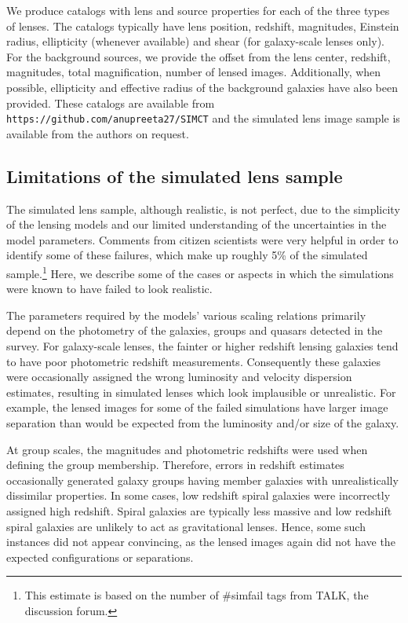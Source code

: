 \documentclass[useAMS,usenatbib,a4paper]{mn2e}
\begin{document}
We produce catalogs with lens and source properties for each of the
three types of lenses.  The catalogs typically have lens position,
redshift, magnitudes, Einstein radius, ellipticity (whenever available)
and shear (for galaxy-scale lenses only). For the background sources, we
provide the offset from the lens center, redshift, magnitudes, total
magnification, number of lensed images. Additionally, when possible,
ellipticity and effective radius of the background galaxies have also
been provided. These catalogs are available from
\texttt{https://github.com/anupreeta27/SIMCT} and the
simulated lens image sample is available from the authors on request.


\subsection{Limitations of the simulated lens sample}

The simulated lens sample, although realistic, is not perfect, due to
the simplicity of the lensing models and our limited understanding of
the uncertainties in the model parameters. Comments from citizen
scientists were very helpful in order to identify some of these failures, which
make up roughly 5\% of the simulated sample.\footnote{This estimate is
based on the number of \#simfail tags from TALK, the discussion forum.}
Here, we describe some of the cases or aspects in which the simulations
were known to have failed to look realistic.

The parameters required by the models' various scaling relations
primarily depend on the photometry of the galaxies, groups and quasars
detected in the survey. For galaxy-scale lenses, the fainter or higher redshift
lensing galaxies tend to have poor photometric redshift
measurements. Consequently these galaxies were occasionally assigned the wrong
luminosity and velocity dispersion estimates, resulting in
simulated lenses which look implausible or unrealistic.  For example,
the lensed images for some of the failed simulations have larger image
separation than would be expected from the luminosity and/or size of the
galaxy.

At group scales, the magnitudes and photometric redshifts were used when defining
the group membership. Therefore, errors in redshift estimates occasionally
generated galaxy
groups having member galaxies with unrealistically dissimilar properties.
In some cases,
low redshift spiral galaxies were incorrectly assigned high redshift.
Spiral galaxies are typically less massive and low redshift spiral galaxies are
unlikely to act as gravitational lenses. Hence, some such instances
did not appear convincing, as the lensed images again did not have the expected
configurations or separations.
\end{document}
